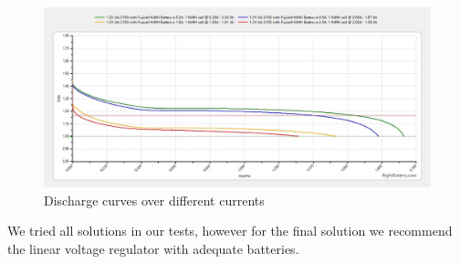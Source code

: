 \begin{figure}[htbp]
\begin{center}
\includegraphics[width=1.0\columnwidth]{images/discharge_curves.jpg}
\end{center}
\caption{Discharge curves over different currents}
\label{fig:dischage_curve}
\end{figure}


We tried all solutions in our tests, however for the final solution we recommend the linear voltage regulator with adequate batteries.

